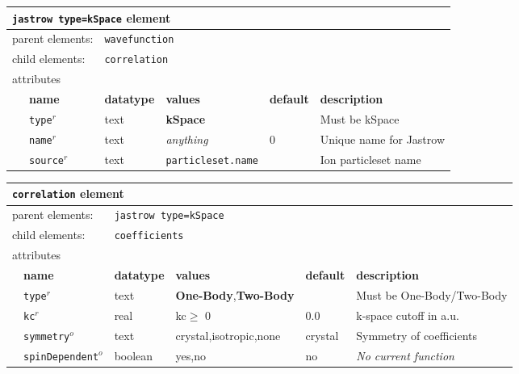 \FloatBarrier
\begin{table}[h]
\begin{center}
\begin{tabularx}{\textwidth}{l l l l l X }
\hline
\multicolumn{6}{l}{\texttt{jastrow type=kSpace} element} \\
\hline
\multicolumn{2}{l}{parent elements:} & \multicolumn{4}{l}{\texttt{wavefunction}}\\
\multicolumn{2}{l}{child  elements:} & \multicolumn{4}{l}{\texttt{correlation}}\\
\multicolumn{2}{l}{attributes}  & \multicolumn{4}{l}{}\\
   &   \bfseries name     & \bfseries datatype & \bfseries values          & \bfseries default  & \bfseries description \\
   & \texttt{type}$^r$    &  text              & \textbf{kSpace}           &                    & Must be kSpace           \\
   & \texttt{name}$^r$    &  text              & \textit{anything}         & 0                  & Unique name for Jastrow \\
   & \texttt{source}$^r$  &  text              & \texttt{particleset.name} &                    & Ion particleset name\\
  \hline
\end{tabularx}
\end{center}
\end{table}
\FloatBarrier

\FloatBarrier
\begin{table}[h]
\begin{center}
\begin{tabularx}{\textwidth}{l l l l l X }
\hline
\multicolumn{6}{l}{\texttt{correlation} element} \\
\hline
\multicolumn{2}{l}{parent elements:} & \multicolumn{4}{l}{\texttt{jastrow type=kSpace}}\\
\multicolumn{2}{l}{child  elements:} & \multicolumn{4}{l}{\texttt{coefficients}}\\
\multicolumn{2}{l}{attributes}  & \multicolumn{4}{l}{}\\
   &   \bfseries name           & \bfseries datatype & \bfseries values  & \bfseries default  & \bfseries description \\
   & \texttt{type}$^r$          &  text              & \textbf{One-Body},\textbf{Two-Body}    &                     & Must be One-Body/Two-Body     \\
   & \texttt{kc}$^r$            &  real              & kc$\ge$ 0                                & 0.0                 & k-space cutoff in a.u. \\
   & \texttt{symmetry}$^o$      &  text              & crystal,isotropic,none                 & crystal             & Symmetry of coefficients\\
   & \texttt{spinDependent}$^o$ &  boolean           & yes,no                                 & no                  & \textit{No current function} \\
  \hline
\end{tabularx}
\end{center}
\end{table}
\FloatBarrier

